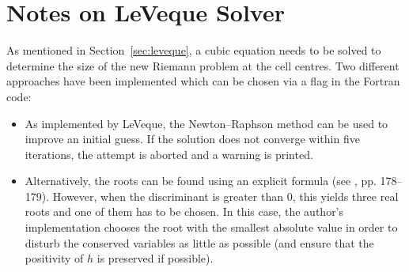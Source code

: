 \section{Notes on LeVeque Solver}
\label{sec:cubic}

As mentioned in Section~\ref{sec:leveque}, a cubic equation needs to be solved to determine the size of the new Riemann problem at the cell centres. Two different approaches have been implemented which can be chosen via a flag in the Fortran code:

\begin{itemize}
  \item As implemented by LeVeque, the Newton--Raphson method can be used to improve an initial guess. If the solution does not converge within five iterations, the attempt is aborted and a warning is printed.
  \item Alternatively, the roots can be found using an explicit formula (see \cite{press2007numerical}, pp. 178--179). However, when the discriminant is greater than $0$, this yields three real roots and one of them has to be chosen. In this case, the author's implementation chooses the root with the smallest absolute value in order to disturb the conserved variables as little as possible (and ensure that the positivity of $h$ is preserved if possible).
\end{itemize}